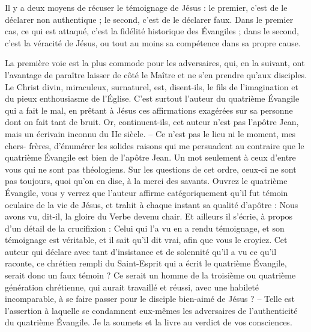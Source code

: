 Il y a deux moyens de récuser le témoignage de Jésus : le premier, c’est de le déclarer non authentique ; le second, c’est de le déclarer faux. Dans le premier cas, ce qui est attaqué, c’est la fidélité historique des Évangiles ; dans le second, c’est la véracité de Jésus, ou tout au moins sa compétence dans sa propre cause.

La première voie est la plus commode pour les adversaires, qui, en la suivant, ont l’avantage de paraître laisser de côté le Maître et ne s’en prendre qu’aux disciples. Le Christ divin, miraculeux, surnaturel, est, disent-ils, le fils de l’imagination et du pieux enthousiasme de l’Église. C’est surtout l’auteur du quatrième Évangile qui a fait le mal, en prêtant à Jésus ces affirmations exagérées sur sa personne dont on fait tant de bruit. Or, continuent-ils, cet auteur n’est pas l’apôtre Jean, mais un écrivain inconnu du IIe siècle. – Ce n’est pas le lieu ni le moment, mes chers- frères, d’énumérer les solides raisons qui me persuadent au contraire que le quatrième Évangile est bien de l’apôtre Jean. Un mot seulement à ceux d’entre vous qui ne sont pas théologiens. Sur les questions de cet ordre, ceux-ci ne sont pas toujours, quoi qu’on en dise, à la merci des savants. Ouvrez le quatrième Évangile, vous y verrez que l’auteur affirme catégoriquement qu’il fut témoin oculaire de la vie de Jésus, et trahit à chaque instant sa qualité d’apôtre : \Og{} Nous avons vu, dit-il, la gloire du Verbe devenu chair.\Fg{} Et ailleurs il s’écrie, à propos d’un détail de la crucifixion : \Og{} Celui qui l’a vu en a rendu témoignage, et son témoignage est véritable, et il sait qu’il dit vrai, afin que vous le croyiez.\Fg{} Cet auteur qui déclare avec tant d’insistance et de solennité qu’il a vu ce qu’il raconte, ce chrétien rempli du Saint-Esprit qui a écrit le quatrième Évangile, serait donc un faux témoin ? Ce serait un homme de la troisième ou quatrième génération chrétienne, qui aurait travaillé et réussi, avec une habileté incomparable, à se faire passer pour le disciple bien-aimé de Jésus ? – Telle est l’assertion à laquelle se condamnent eux-mêmes les adversaires de l’authenticité du quatrième Évangile. Je la soumets et la livre au verdict de vos consciences.

